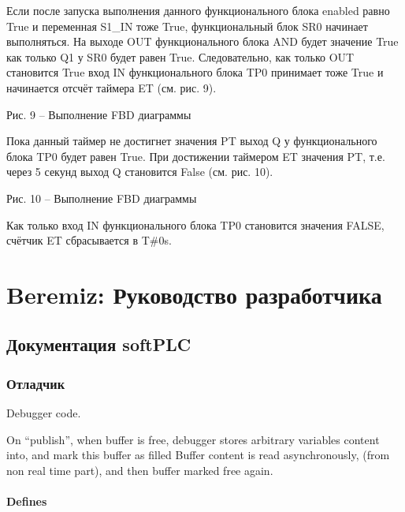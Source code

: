 \documentclass[letterpaper,10pt,russian]{sphinxmanual}
\begin{document}
Если после запуска выполнения данного функционального блока enabled
равно True и переменная S1\_IN тоже True, функциональный блок SR0
начинает выполняться. На выходе OUT функционального блока AND будет
значение True как только Q1 у SR0 будет равен True. Следовательно, как
только OUT становится True вход IN функционального блока TP0 принимает
тоже True и начинается отсчёт таймера ET (см. рис. 9).


Рис. 9 – Выполнение FBD диаграммы

Пока данный таймер не достигнет значения PT выход Q у функционального
блока TP0 будет равен True. При достижении таймером ET значения PT, т.е.
через 5 секунд выход Q становится False (см. рис. 10).


Рис. 10 – Выполнение FBD диаграммы

Как только вход IN функционального блока TP0 становится значения FALSE,
счётчик ET сбрасывается в T\#0s.


\section{Beremiz: Руководство разработчика}
\label{developer_guide/index:beremiz}\label{developer_guide/index::doc}

\subsection{Документация softPLC}
\label{developer_guide/soft_plc/index:softplc}\label{developer_guide/soft_plc/index::doc}

\subsubsection{Отладчик}
\label{developer_guide/soft_plc/debugger::doc}\label{developer_guide/soft_plc/debugger:id1}
Debugger code. 

On ``publish'', when buffer is free, debugger stores arbitrary variables content into, and mark this buffer as filled Buffer content is read asynchronously, (from non real time part), and then buffer marked free again. 
\paragraph{Defines}
\end{document}
